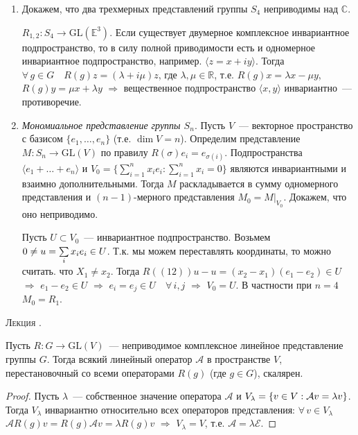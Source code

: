\documentclass[a4paper]{article}
\newcounter{lec}
\renewcommand{\thelec}{\Roman{lec}}
\newcommand*{\lecture}[1]{\refstepcounter{lec}\vspace{20pt}
\begin{center}{\rmfamily\textsc{Лекция \thelec. \\ \textbf{#1}}}\vspace{5pt}
\end{center}}
\newcommand*{\p}[1]{#1\nobreak\discretionary{}{\hbox{$\mathsurround=0pt #1$}}{}}
\begin{document}
\prim
\begin{enumerate}
  \item Докажем, что два трехмерных представлений группы $S_4$
  неприводимы над $\mathbb{C}$.

  $R_{1,2}\colon S_4\to \mathrm{GL}(\mathbb{E}^3)$. Если существует двумерное
  комплексное инвариантное подпространство, то в силу полной
  приводимости есть и одномерное инвариантное подпространство,
  например. $\langle z=x+iy\rangle$. Тогда $\forall \, g\in G\quad
  R(g)z=(\lambda+i\mu)z$, где $\lambda,\mu\in \mathbb{R}$, т.е. $R(g)x=\lambda x-\mu
  y$, $R(g)y=\mu x+\lambda y$ $\Rightarrow$ вещественное
  подпространство $\langle x,y\rangle$ инвариантно~--- противоречие.
  \item \emph{Мономиальное представление группы $S_n$}. Пусть
  $V$~--- векторное пространство с базисом $\{e_1,\ldots,e_n\}$ (т.е. $\dim V=n$).
  Определим представление $M\colon S_n\to \mathrm{GL}(V)$ по правилу
  $R(\sigma)e_i=e_{\sigma(i)}$. Подпространства $\langle
  e_1+\ldots+e_n\rangle$ и $V_0=\Big\{\sum\limits_{i=1}^n x_ie_i: \sum\limits_{i=1}^n
  x_i=0\Big\}$ являются инвариантными и взаимно дополнительными.
  Тогда $M$ раскладывается в сумму одномерного представления и
  $(n-1)$-мерного представления $M_0=M|_{V_0}$. Докажем, что оно
  неприводимо.

  Пусть $U\subset V_0$~--- инвариантное подпространство. Возьмем $0\neq u\p=\sum\limits_i x_ie_i\in
  U$. Т.к. мы можем переставлять координаты, то можно считать. что
  $X_1\neq x_2$. Тогда $R((12))u-u=(x_2-x_1)(e_1-e_2)\in U$
  $\Rightarrow$ $e_1-e_2\in U$ $\Rightarrow$ $e_i=e_j\in U\quad \forall \,
  i,j$ $\Rightarrow$ $V_0=U$. В частности при $n=4$ $M_0=R_1$.
\end{enumerate}
\lecture{}

\begin{theorem}
Пусть $R\colon G\to \mathrm{GL}(V)$~--- неприводимое комплексное
линейное представление группы $G$. Тогда всякий линейный оператор
$\mathcal{A}$ в пространстве $V$, перестановочный со всеми
операторами $R(g)$ (где $g\in G$), скалярен.
\end{theorem}

\begin{proof}
Пусть $\lambda$~--- собственное значение оператора $\mathcal{A}$ и
$V_\lambda\p=\{v\in V: \mathcal{A}v=\lambda v\}$. Тогда $V_\lambda$
инвариантно относительно всех операторов представления: $\forall \,
v\in V_\lambda$ \quad $\mathcal{A}R(g)v=R(g)\mathcal{A}v=\lambda
R(g)v$ $\Rightarrow$ $V_\lambda=V$, т.е.
$\mathcal{A}=\lambda\mathcal{E}$.
\end{proof}
\end{document}
